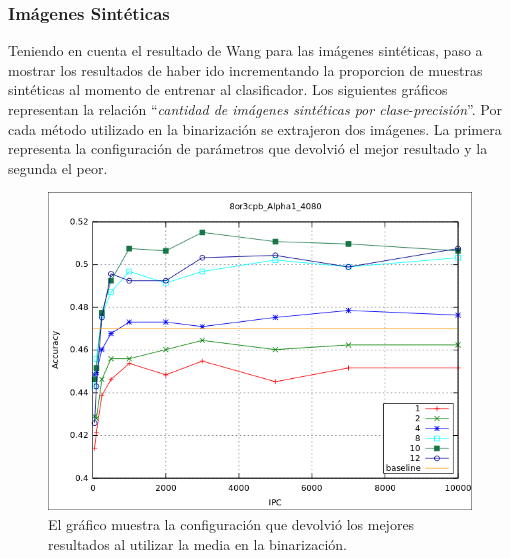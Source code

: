     	\newpage
    	\subsubsection{Imágenes Sintéticas}
    	
    	Teniendo en cuenta el resultado de Wang para las imágenes sintéticas, paso a mostrar 
los resultados de haber ido incrementando la proporcion de muestras sintéticas al momento de entrenar al clasificador. Los siguientes gráficos representan la relación ``\textit{cantidad de imágenes sintéticas por clase}-\textit{precisión}''. Por cada método utilizado en la binarización se extrajeron dos imágenes. La primera representa la configuración de parámetros que devolvió el mejor resultado y la segunda el peor.

			\begin{figure}[htbp]
				\centering
				\includegraphics[scale=0.6]{img/resultados/sinteticas/best_media_8or3cpb_Alpha1_4080.png}
				\caption[Sintéticas media mejor resultado]{El gráfico muestra la configuración que devolvió los mejores resultados al utilizar la media en la binarización.}
				\label{fig: Sinteticas-media-mejor}
			\end{figure}
			
